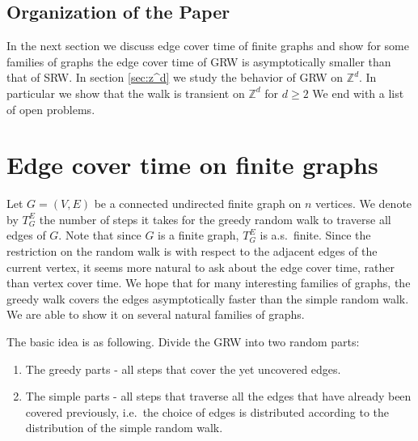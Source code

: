 \documentclass[12pt,a4paper]{article}
\newcommand{\0}{{\bf 0}}
\newcommand{\Z}{{\mathbb Z}}
\newcommand{\enumlist}[1]{\begin{enumerate}#1\end{enumerate}}
\begin{document}
\subsection{Organization of the Paper}\label{sec:organization}

In the next section we discuss edge cover time of finite graphs
and show for some families of graphs the edge cover time of GRW
is asymptotically smaller than that of SRW.
In section \ref{sec:z^d} we study the behavior of GRW on $\Z^d$.
In particular we show that the walk is transient on $\Z^d$ for $d \geq 2$
We end with a list of open problems.



\section{Edge cover time on finite graphs}\label{sec:edge_cover_time}

    Let $G=(V,E)$ be a connected undirected finite graph on $n$ vertices.
    We denote by $T^E_G$ the number of steps it takes for the greedy random walk to traverse all edges of $G$. Note that since $G$ is a finite graph, $T^E_G$ is a.s.\ finite.
    Since the restriction on the random walk is with respect to the adjacent edges of the current vertex,
    it seems more natural to ask about the edge cover time, rather than vertex cover time.
    We hope that for many interesting families of graphs, the greedy walk covers the edges asymptotically faster
    than the simple random walk. We are able to show it on several natural families of graphs.
    \medskip

    The basic idea is as following.
    Divide the GRW into two random parts:
    \enumlist{
        \item The greedy parts - all steps that cover the yet uncovered edges.
        \item The simple parts - all steps that traverse all the edges that have already been covered previously,
                                i.e.\ the choice of edges is distributed according to the distribution of the simple random walk.
    }
\end{document}
